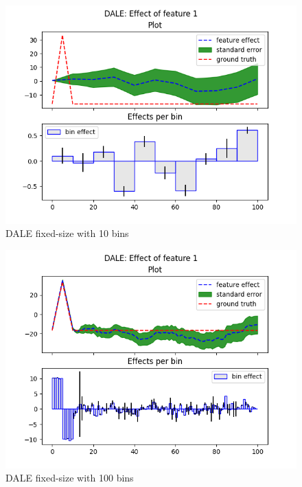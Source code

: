 \documentclass{article}
\begin{document}
\begin{figure}[!h]
\centering
\includegraphics[width=0.9\linewidth]{Figure_dale_fixed_10.png}
\caption{DALE fixed-size with 10 bins}
\label{im:fixed-10}
\end{figure}

\begin{figure}[!h]
\centering
\includegraphics[width=0.9\linewidth]{Figure_dale_fixed_100.png}
\caption{DALE fixed-size with 100 bins}
\label{im:fixed-100}
\end{figure}
\end{document}
